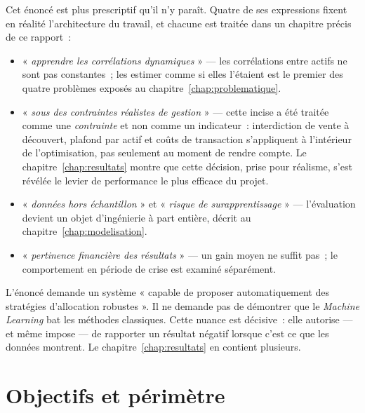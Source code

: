Cet énoncé est plus prescriptif qu'il n'y paraît. Quatre de ses expressions
fixent en réalité l'architecture du travail, et chacune est traitée dans un
chapitre précis de ce rapport~:

\begin{itemize}
  \item « \emph{apprendre les corrélations dynamiques} » — les corrélations entre
        actifs ne sont pas constantes~; les estimer comme si elles l'étaient est
        le premier des quatre problèmes exposés au
        chapitre~\ref{chap:problematique}.
  \item « \emph{sous des contraintes réalistes de gestion} » — cette incise a été
        traitée comme une \emph{contrainte} et non comme un indicateur~:
        interdiction de vente à découvert, plafond par actif et coûts de
        transaction s'appliquent à l'intérieur de l'optimisation, pas seulement
        au moment de rendre compte. Le chapitre~\ref{chap:resultats} montre que
        cette décision, prise pour réalisme, s'est révélée le levier de
        performance le plus efficace du projet.
  \item « \emph{données hors échantillon} » et « \emph{risque de
        surapprentissage} » — l'évaluation devient un objet d'ingénierie à part
        entière, décrit au chapitre~\ref{chap:modelisation}.
  \item « \emph{pertinence financière des résultats} » — un gain moyen ne suffit
        pas~; le comportement en période de crise est examiné séparément.
\end{itemize}

\begin{remarquebox}
L'énoncé demande un système « capable de proposer automatiquement des stratégies
d'allocation robustes ». Il ne demande pas de démontrer que le \emph{Machine
Learning} bat les méthodes classiques. Cette nuance est décisive~: elle autorise —
et même impose — de rapporter un résultat négatif lorsque c'est ce que les
données montrent. Le chapitre~\ref{chap:resultats} en contient plusieurs.
\end{remarquebox}

\section{Objectifs et périmètre}

